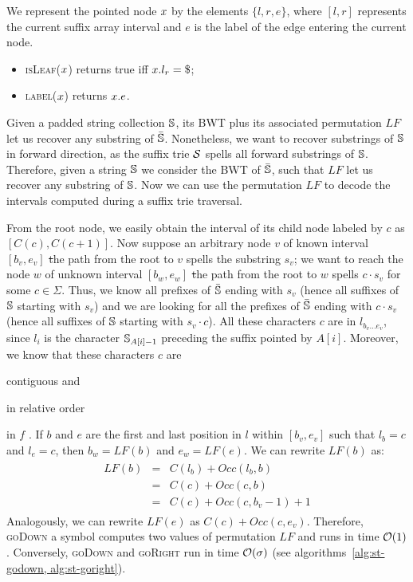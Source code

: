 We represent the pointed node $x$ by the elements $\{ l, r, e \}$, where $[l,r]$ represents the current suffix array interval and $e$ is the label of the edge entering the current node.
\begin{itemize}
\item \textsc{isLeaf}($x$) returns true iff $\Tn.l_r = \$$;
\item \textsc{label}($x$) returns $x.e$.
\end{itemize}

Given a padded string collection $\mathbb {S}$, its BWT plus its associated permutation $LF$ let us recover any substring of $\bar{\mathbb {S}}$.
Nonetheless, we want to recover substrings of $\mathbb {S}$ in forward direction, as the suffix trie $\mathcal {S}$ spells all forward substrings of $\mathbb {S}$.
Therefore, given a string $\mathbb {S}$ we consider the BWT of $\bar{\mathbb {S}}$, such that $LF$ let us recover any substring of $\mathbb {S}$.
Now we can use the permutation $LF$ to decode the intervals computed during a suffix trie traversal.

From the root node, we easily obtain the interval of its child node labeled by $c$ as $[C(c),C(c+1)]$.
Now suppose an arbitrary node $v$ of known interval $[b_v, e_v]$ \st the path from the root to $v$ spells the substring $s_v$;
we want to reach the node $w$ of unknown interval $[b_w, e_w]$ \st the path from the root to $w$ spells $c \cdot s_v$ for some $c \in \Sigma$.
Thus, we know all prefixes of $\bar{\mathbb {S}}$ ending with $s_v$ (hence all suffixes of $\mathbb {S}$ starting with $s_v$) and we are looking for all the prefixes of $\bar{\mathbb {S}}$ ending with $c \cdot s_v$ (hence all suffixes of $\mathbb {S}$ starting with $s_v \cdot c$).
All these characters $c$ are in $l_{b_v \dots e_v}$, since $l_i$ is the character $\mathbb {S}_{A[i] - 1}$ preceding the suffix pointed by $A[i]$.
Moreover, we know that these characters $c$ are
\begin{inparaenum}[(i)]
\item contiguous and
\item in relative order
\end{inparaenum}
in $f$ \citep{Ferragina2000}.
If $b$ and $e$ are the first and last position in $l$ within $[b_v, e_v]$ such that $l_b = c$ and $l_e = c$, then $b_w = LF(b)$ and $e_w = LF(e)$.
We can rewrite $LF(b)$ as:
\begin{eqnarray}
\begin{array}{lcl}
LF(b) &=& C(l_b) + Occ(l_b, b)\\
 	  &=& C(c) + Occ(c, b)\\
	  &=& C(c) + Occ(c, b_v - 1) + 1
\end{array}
\end{eqnarray}
Analogously, we can rewrite $LF(e)$ as $C(c) + Occ(c, e_v)$.
Therefore, \textsc{goDown} a symbol computes two values of permutation $LF$ and runs in time $\mathcal{O}(1)$.
Conversely, \textsc{goDown} and \textsc{goRight} run in time $\mathcal{O}(\sigma)$ (see algorithms~\ref{alg:st-godown, alg:st-goright}).

